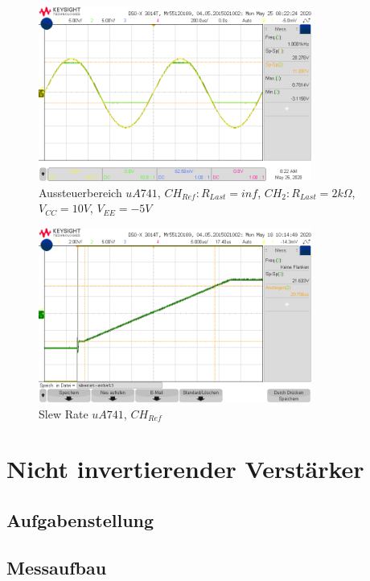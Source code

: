 \begin{figure}[H]
    \centering
    \includegraphics[width=0.8\textwidth]{Lab_1/Messungen/Folger/scope_5.png}
    \caption{Aussteuerbereich $uA741$, $CH_{Ref}: R_{Last} = inf$, $CH_{2}: R_{Last} = 2k\Omega$, $V_{CC} = 10V$, $V_{EE} = -5V$}
    \label{fig:my_label}
\end{figure}

\begin{figure}[H]
    \centering
    \includegraphics[width=0.8\textwidth]{Lab_1/Messungen/Folger/uberst-schw13.png}
    \caption{Slew Rate $uA741$, $CH_{Ref}$}
    \label{fig:my_label}
\end{figure}

\section{Nicht invertierender Verstärker}
\subsection{Aufgabenstellung}


\subsection{Messaufbau}


